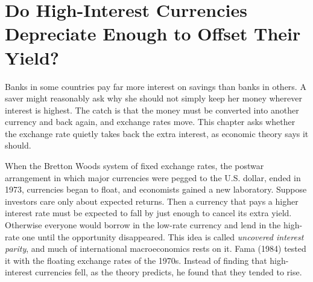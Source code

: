\makeatletter
{}
\makeatother

\makeatletter
\makeatother

\chapter{Do High-Interest Currencies Depreciate Enough to Offset Their Yield?}
\label{ch:11}
\providecommand{\term}[1]{\emph{#1}}

Banks in some countries pay far more interest on savings than banks in others. A saver might reasonably ask why she should not simply keep her money wherever interest is highest. The catch is that the money must be converted into another currency and back again, and exchange rates move. This chapter asks whether the exchange rate quietly takes back the extra interest, as economic theory says it should.

When the Bretton Woods system of fixed exchange rates, the postwar arrangement in which major currencies were pegged to the U.S. dollar, ended in 1973, currencies began to float, and economists gained a new laboratory. Suppose investors care only about expected returns. Then a currency that pays a higher interest rate must be expected to fall by just enough to cancel its extra yield. Otherwise everyone would borrow in the low-rate currency and lend in the high-rate one until the opportunity disappeared. This idea is called \term{uncovered interest parity}, and much of international macroeconomics rests on it. Fama (1984) tested it with the floating exchange rates of the 1970s. Instead of finding that high-interest currencies fell, as the theory predicts, he found that they tended to rise.

